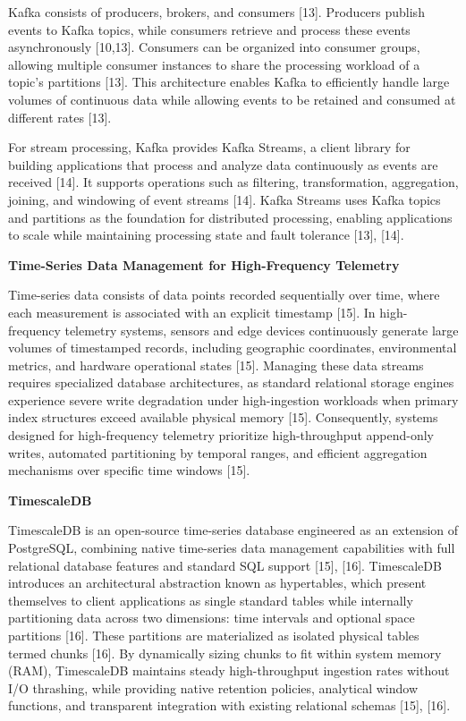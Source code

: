 \documentclass[12pt]{article}
\newcommand{\infofont}{\fontsize{16pt}{19.2pt}\selectfont}
\newcommand{\MinorHead}[1]{\vspace{0.6em}\noindent{\infofont\bfseries #1}\vspace{0.2em}\par}
\begin{document}
Kafka consists of producers, brokers, and consumers [13]. Producers publish events to
Kafka topics, while consumers retrieve and process these events asynchronously [10,13].
Consumers can be organized into consumer groups, allowing multiple consumer instances
to share the processing workload of a topic's partitions [13]. This architecture enables Kafka
to efficiently handle large volumes of continuous data while allowing events to be retained
and consumed at different rates [13].

For stream processing, Kafka provides Kafka Streams, a client library for building
applications that process and analyze data continuously as events are received [14]. It
supports operations such as filtering, transformation, aggregation, joining, and windowing of
event streams [14]. Kafka Streams uses Kafka topics and partitions as the foundation for
distributed processing, enabling applications to scale while maintaining processing state and
fault tolerance [13], [14].

\MinorHead{2.1.3.2 Time-Series Databases}

\textbf{\infofont Time-Series Data Management for High-Frequency Telemetry}\par
\infofont
Time-series data consists of data points recorded sequentially over time, where each
measurement is associated with an explicit timestamp [15]. In high-frequency telemetry
systems, sensors and edge devices continuously generate large volumes of timestamped
records, including geographic coordinates, environmental metrics, and hardware operational
states [15]. Managing these data streams requires specialized database architectures, as
standard relational storage engines experience severe write degradation under
high-ingestion workloads when primary index structures exceed available physical memory
[15]. Consequently, systems designed for high-frequency telemetry prioritize high-throughput
append-only writes, automated partitioning by temporal ranges, and efficient aggregation
mechanisms over specific time windows [15].

\textbf{\infofont TimescaleDB}\par
\infofont
TimescaleDB is an open-source time-series database engineered as an extension of
PostgreSQL, combining native time-series data management capabilities with full relational
database features and standard SQL support [15], [16]. TimescaleDB introduces an
architectural abstraction known as hypertables, which present themselves to client
applications as single standard tables while internally partitioning data across two
dimensions: time intervals and optional space partitions [16]. These partitions are
materialized as isolated physical tables termed chunks [16]. By dynamically sizing chunks to
fit within system memory (RAM), TimescaleDB maintains steady high-throughput ingestion
rates without I/O thrashing, while providing native retention policies, analytical window
functions, and transparent integration with existing relational schemas [15], [16].
\end{document}
